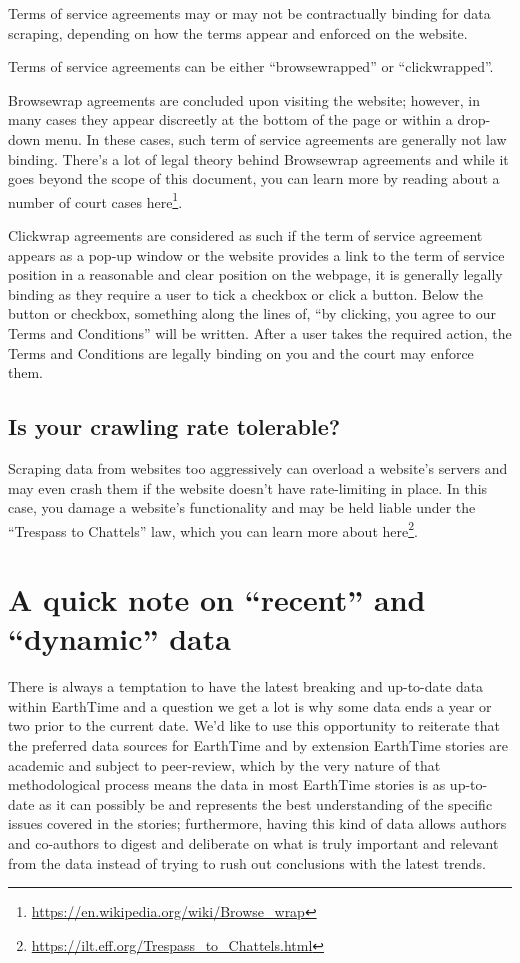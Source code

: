 \documentclass[
]{book}
\renewcommand{\href}[2]{#2\footnote{\url{#1}}}
\begin{document}
Terms of service agreements may or may not be contractually binding for data scraping, depending on how the terms appear and enforced on the website.

Terms of service agreements can be either ``browsewrapped'' or ``clickwrapped''.

Browsewrap agreements are concluded upon visiting the website; however, in many cases they appear discreetly at the bottom of the page or within a drop-down menu. In these cases, such term of service agreements are generally not law binding. There's a lot of legal theory behind Browsewrap agreements and while it goes beyond the scope of this document, you can learn more by reading about a number of court cases \href{https://en.wikipedia.org/wiki/Browse_wrap}{here}.

Clickwrap agreements are considered as such if the term of service agreement appears as a pop-up window or the website provides a link to the term of service position in a reasonable and clear position on the webpage, it is generally legally binding as they require a user to tick a checkbox or click a button. Below the button or checkbox, something along the lines of, ``by clicking, you agree to our Terms and Conditions'' will be written. After a user takes the required action, the Terms and Conditions are legally binding on you and the court may enforce them.

\hypertarget{is-your-crawling-rate-tolerable}{%
\subsection*{Is your crawling rate tolerable?}\label{is-your-crawling-rate-tolerable}}


Scraping data from websites too aggressively can overload a website's servers and may even crash them if the website doesn't have rate-limiting in place. In this case, you damage a website's functionality and may be held liable under the ``Trespass to Chattels'' law, which you can learn more about \href{https://ilt.eff.org/Trespass_to_Chattels.html}{here}.

\hypertarget{a-quick-note-on-recent-and-dynamic-data}{%
\section{A quick note on ``recent'' and ``dynamic'' data}\label{a-quick-note-on-recent-and-dynamic-data}}

There is always a temptation to have the latest breaking and up-to-date data within EarthTime and a question we get a lot is why some data ends a year or two prior to the current date. We'd like to use this opportunity to reiterate that the preferred data sources for EarthTime and by extension EarthTime stories are academic and subject to peer-review, which by the very nature of that methodological process means the data in most EarthTime stories is as up-to-date as it can possibly be and represents the best understanding of the specific issues covered in the stories; furthermore, having this kind of data allows authors and co-authors to digest and deliberate on what is truly important and relevant from the data instead of trying to rush out conclusions with the latest trends.
\end{document}
